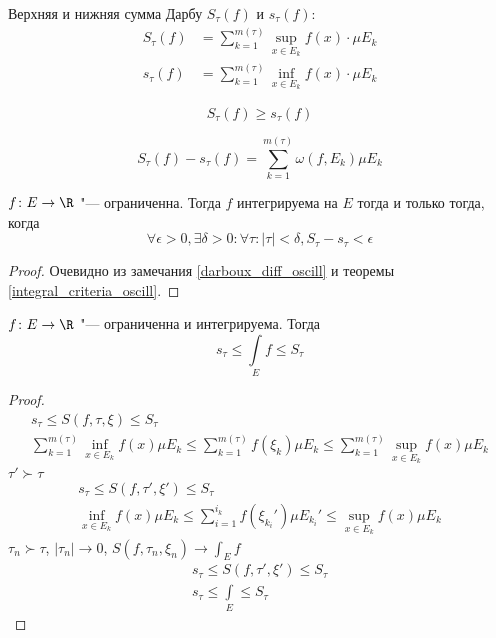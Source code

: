 \begin{Def}
	Верхняя и нижняя сумма Дарбу $S_\tau(f)$ и $s_\tau(f)$:
	\begin{align*}
		S_\tau(f) &= \sum_{k=1}^{m(\tau)} \sup_{x \in E_k} f(x) \cdot \mu E_k \\
		s_\tau(f) &= \sum_{k=1}^{m(\tau)} \inf_{x \in E_k} f(x) \cdot \mu E_k
	\end{align*}
\end{Def}
\begin{Rem}
	\[ S_\tau(f) \ge s_\tau(f) \]
\end{Rem}
\begin{Rem}\label{darboux_diff_oscill}
	\[ S_\tau(f) - s_\tau(f) = \sum_{k=1}^{m(\tau)} \omega(f, E_k) \mu E_k \]
\end{Rem}

\begin{theorem}
	$f\colon E \to \R$ "--- ограниченна.
	Тогда $f$ интегрируема на $E$ тогда и только тогда, когда
	\[ \forall \epsilon > 0, \exists \delta > 0\colon \forall \tau\colon |\tau| < \delta, S_\tau - s_\tau < \epsilon \]
\end{theorem}
\begin{proof}
	Очевидно из замечания \ref{darboux_diff_oscill} и теоремы \ref{integral_criteria_oscill}.
\end{proof}

\begin{conseq}
	$f\colon E \to \R$ "--- ограниченна и интегрируема.
	Тогда
	\[ s_\tau \le \int\limits_E f \le S_\tau \]
\end{conseq}
\begin{proof}
	\begin{gather*}
		s_\tau \le S(f, \tau, \xi) \le S_\tau \\
		\sum_{k=1}^{m(\tau)} \inf_{x \in E_k} f(x) \mu E_k
			\le \sum_{k=1}^{m(\tau)} f(\xi_k) \mu E_k
			\le \sum_{k=1}^{m(\tau)} \sup_{x \in E_k} f(x) \mu E_k
	\end{gather*}
	$\tau' \succ \tau$
	\begin{gather*}
		s_\tau \le S(f, \tau', \xi') \le S_\tau \\
		\inf_{x \in E_k} f(x) \mu E_k
			\le \sum_{i=1}^{i_k} f(\xi_{k_i}') \mu E_{k_i}'
			\le \sup_{x \in E_k} f(x) \mu E_k
	\end{gather*}
	$\tau_n \succ \tau$, $|\tau_n| \to 0$, $S(f, \tau_n, \xi_n) \to \int_E f$
	\begin{gather*}
		s_\tau \le S(f, \tau', \xi') \le S_\tau \\
		s_\tau \le \int\limits_E \le S_\tau
	\end{gather*}
\end{proof}

